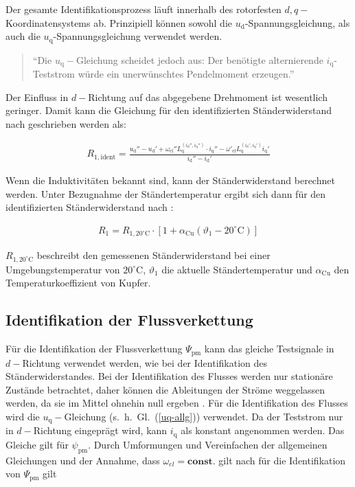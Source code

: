\documentclass[conference,twocolumn]{IEEEtran}
\newcommand{\x}[1]{\mathrm{#1}}
\begin{document}
Der gesamte Identifikationsprozess läuft innerhalb des rotorfesten $d, q-$Koordinatensystems ab.
Prinzipiell können sowohl die $u_\x{d}$-Spannungsgleichung, als auch die $u_\x{q}$-Spannungsgleichung verwendet werden.

\begin{quote}
\enquote{Die $u_\x{q}-$Gleichung scheidet jedoch aus: Der benötigte alternierende $i_\x{q}$-Teststrom würde ein unerwünschtes Pendelmoment erzeugen.}\autocite[S.~148]{Kellner2012}
\end{quote}

Der Einfluss in $d-$Richtung auf das abgegebene Drehmoment ist wesentlich geringer.
Damit kann die Gleichung für den identifizierten Ständerwiderstand nach \textcite{Kellner2012} geschrieben werden als:

\begin{small}
\begin{align}
R_\x{1,ident} = \frac{u_\x{d}'' - u_\x{d}' + \omega_\x{el}'' L_\x{q}^{(i_\x{d}'',i_\x{q}'')}\cdot i_\x{q}'' - \omega'_\x{el}L_\x{q}^{(i_\x{d}',i_\x{q}')}i_\x{q}'}{i_\x{d}''-i_\x{d}'}
\end{align}
\end{small}

Wenn die Induktivitäten bekannt sind, kann der Ständerwiderstand berechnet werden.
Unter Bezugnahme der Ständertemperatur ergibt sich dann für den identifizierten Ständerwiderstand nach \autocite{Kellner2012}:

\begin{align}
R_\x{1} = R_\x{1,20^{\circ}\x{C}}\cdot \left[ 1 + \alpha_\x{Cu}(\vartheta_\x{1} - 20^{\circ}\x{C})\right]
\end{align}

$R_\x{1,20^{\circ}\x{C}}$ beschreibt den gemessenen Ständerwiderstand bei einer Umgebungstemperatur von $20^{\circ}\x{C}$, $\vartheta_\x{1}$ die aktuelle Ständertemperatur und $\alpha_\x{Cu}$ den Temperaturkoeffizient von Kupfer.


\subsection{Identifikation der Flussverkettung}\label{sec:ident-fluss}

Für die Identifikation der Flussverkettung $\Psi_\x{pm}$ kann das gleiche Testsignale in $d-$Richtung verwendet werden, wie bei der Identifikation des Ständerwiderstandes.
Bei der Identifikation des Flusses werden nur stationäre Zustände betrachtet, daher können die Ableitungen der Ströme weggelassen werden, da sie im Mittel ohnehin null ergeben \autocite{Kellner2012}.
Für die Identifikation des Flusses wird die $u_\x{q}-$Gleichung (s.~h.~Gl.~(\ref{uq-allg})) verwendet.
Da der Teststrom nur in $d-$Richtung eingeprägt wird, kann $i_\x{q}$ als konstant angenommen werden.
Das Gleiche gilt für $\psi_\x{pm}$.
Durch Umformungen und Vereinfachen der allgemeinen Gleichungen und der Annahme, dass $\omega_{el}=\textbf{const.}$ gilt nach \textcite{Kellner2012} für die Identifikation von $\Psi_\x{pm}$ gilt
\end{document}
